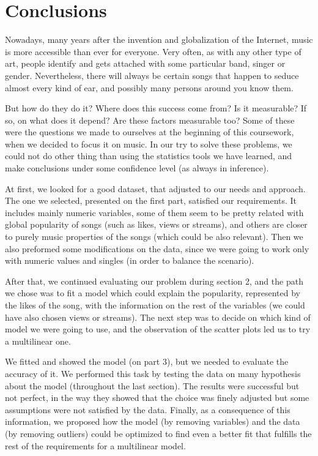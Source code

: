 \documentclass[11pt]{article}\usepackage[]{graphicx}\usepackage[]{xcolor}
\begin{document}
\newpage
\section{Conclusions}
Nowadays, many years after the invention and globalization of the Internet, music is more accessible than ever for everyone. Very often, as with any other type of art, people identify and gets attached with some particular band, singer or gender. Nevertheless, there will always be certain songs that happen to seduce almost every kind of ear, and possibly many persons around you know them.

But how do they do it? Where does this success come from? Is it measurable? If so, on what does it depend? Are these factors measurable too? Some of these were the questions we made to ourselves at the beginning of this coursework, when we decided to focus it on music. In our try to solve these problems, we could not do other thing than using the statistics tools we have learned, and make conclusions under some confidence level (as always in inference).

At first, we looked for a good dataset, that adjusted to our needs and approach. The one we selected, presented on the first part, satisfied our requirements. It includes mainly numeric variables, some of them seem to be pretty related with global popularity of songs (such as likes, views or streams), and others are closer to purely music properties of the songs (which could be also relevant). Then we also preformed some modifications on the data, since we were going to work only with numeric values and singles (in order to balance the scenario).

After that, we continued evaluating our problem during section 2, and the path we chose was to fit a model which could explain the popularity, represented by the likes of the song, with the information on the rest of the variables (we could have also chosen views or streams). The next step was to decide on which kind of model we were going to use, and the observation of the scatter plots led us to try a multilinear one.

We fitted and showed the model (on part 3), but we needed to evaluate the accuracy of it. We performed this task by testing the data on many hypothesis about the model (throughout the last section). The results were successful but not perfect, in the way they showed that the choice was finely adjusted but some assumptions were not satisfied by the data. Finally, as a consequence of this information, we proposed how the model (by removing variables) and the data (by removing outliers) could be optimized to find even a better fit that fulfills the rest of the requirements for a multilinear model.
\end{document}
